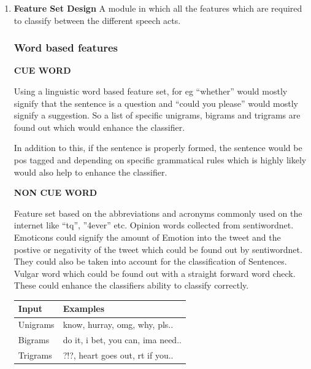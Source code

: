 \documentclass[conference]{IEEEtran}
\begin{document}
\begin{enumerate}
\item{\textbf{Feature Set Design}}
A module in which all the features which are required to classify between the different speech acts.

\subsubsection{\textbf{Word based features}}
\textbf{CUE WORD}

\par Using a linguistic word based feature set, for eg “whether”  would mostly signify that the sentence is a question and “could you please” would mostly signify a suggestion. So a list of specific unigrams, bigrams and trigrams are found out which would enhance the classifier.

\par In addition to this, if the sentence is properly formed, the sentence would be pos tagged and depending on specific grammatical rules which is highly likely would also help to enhance the classifier.
		
\par \textbf{NON CUE WORD}
\par Feature set based on the abbreviations and acronyms commonly used on the internet like “tq”, ”4ever” etc. Opinion words collected from sentiwordnet. Emoticons could signify the amount of Emotion into the tweet and the postive or negativity of the tweet which could be found out by sentiwordnet. They could also be taken into account for the classification of Sentences. Vulgar word which could be found out with a straight forward word check. These could enhance the classifiers ability to classify correctly.

\begin{table}[!ht]
\centering

    \label{tab:Cue Words and Phrases}

    \begin{small}
    \begin{tabular}{|p{1.5cm}|p{4cm}|}
    \hline {\bfseries Input} & {\bfseries Examples} \\
    \hline
     Unigrams &  know, hurray, omg, why, pls..\\
     \hline
     Bigrams & do it, i bet, you can, ima need.. \\
     \hline
     Trigrams & ?!?, heart goes out, rt if you..\\
     \hline
    \end{tabular}
    \end{small} 
\end{table}


\end{enumerate}
\end{document}
